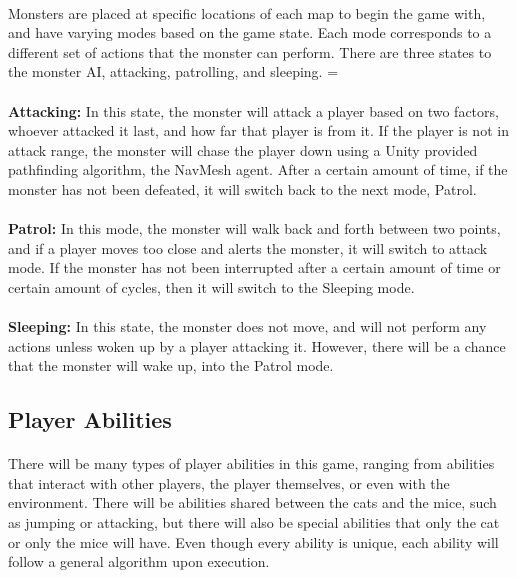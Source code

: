 \documentclass[12pt, titlepage]{article}
\begin{document}
\paragraph{}Monsters are placed at specific locations of each map to begin the game with, and have varying modes based on the game state. Each mode corresponds to a different set of actions that the monster can perform. There are three states to the monster AI, attacking, patrolling, and sleeping. 
=\paragraph{}\textbf{Attacking:} In this state, the monster will attack a player based on two factors, whoever attacked it last, and how far that player is from it. If the player is not in attack range, the monster will chase the player down using a Unity provided pathfinding algorithm, the NavMesh agent. After a certain amount of time, if the monster has not been defeated, it will switch back to the next mode, Patrol.
\paragraph{}\textbf{Patrol:} In this mode, the monster will walk back and forth between two points, and if a player moves too close and alerts the monster, it will switch to attack mode. If the monster has not been interrupted after a certain amount of time or certain amount of cycles, then it will switch to the Sleeping mode.
\paragraph{}\textbf{Sleeping:} In this state, the monster does not move, and will not perform any actions unless woken up by a player attacking it. However, there will be a chance that the monster will wake up, into the Patrol mode. 
\subsection{Player Abilities}
\paragraph{}There will be many types of player abilities in this game, ranging from abilities that interact with other players, the player themselves, or even with the environment. There will be abilities shared between the cats and the mice, such as jumping or attacking, but there will also be special abilities that only the cat or only the mice will have. Even though every ability is unique, each ability will follow a general algorithm upon execution.
\end{document}
